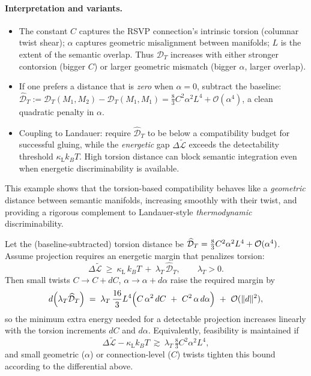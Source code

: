 \documentclass[a4paper,11pt]{article}
\begin{document}
\paragraph{Interpretation and variants.}
\begin{itemize}
\item The constant $C$ captures the RSVP connection’s intrinsic torsion (columnar
twist shear); $\alpha$ captures geometric misalignment between manifolds; $L$
is the extent of the semantic overlap. Thus $\mathcal{D}_T$ increases with
either stronger contorsion (bigger $C$) or larger geometric mismatch (bigger
$\alpha$, larger overlap).
\item If one prefers a distance that is \emph{zero} when $\alpha=0$,
subtract the baseline: $\widehat{\mathcal{D}}_T := \mathcal{D}_T(M_1,M_2)-
\mathcal{D}_T(M_1,M_1)=\tfrac{8}{3}C^2\alpha^2 L^4+\mathcal{O}(\alpha^4)$,
a clean quadratic penalty in $\alpha$.
\item Coupling to Landauer: require $\widehat{\mathcal{D}}_T$ to be below a
compatibility budget for successful gluing, while the \emph{energetic} gap
$\Delta\widetilde{\mathcal{L}}$ exceeds the detectability threshold
$\kappa_{\mathrm{L}}k_B T$. High torsion distance can block semantic
integration even when energetic discriminability is available.
\end{itemize}

This example shows that the torsion-based compatibility behaves like a
\emph{geometric} distance between semantic manifolds, increasing smoothly with
their twist, and providing a rigorous complement to Landauer-style
\emph{thermodynamic} discriminability.

\begin{corollary}
\label{cor:landauer-torsion-coupling}
Let the (baseline-subtracted) torsion distance be
$\widehat{\mathcal{D}}_{T}=\tfrac{8}{3}C^{2}\alpha^{2}L^{4}+{\cal O}(\alpha^{4})$.
Assume projection requires an energetic margin that penalizes torsion:
\[
\Delta\widetilde{\mathcal{L}}\ \ge\ \kappa_{\mathrm{L}}\,k_{B}T\ +\ \lambda_{T}\,\widehat{\mathcal{D}}_{T},
\qquad \lambda_{T}>0.
\]
Then small twists $C\!\to\! C{+}dC$, $\alpha\!\to\!\alpha{+}d\alpha$ raise the
required margin by
\[
d\!\left(\lambda_{T}\widehat{\mathcal{D}}_{T}\right)
\;=\;
\lambda_{T}\,\frac{16}{3}L^{4}\Big(C\,\alpha^{2}\,dC\ +\ C^{2}\,\alpha\,d\alpha\Big)
\ +\ {\cal O}(\|d\|^{2}),
\]
so the minimum extra energy needed for a detectable projection increases linearly
with the torsion increments $dC$ and $d\alpha$. Equivalently, feasibility is
maintained if
\[
\Delta\widetilde{\mathcal{L}}-\kappa_{\mathrm{L}}k_{B}T
\ \gtrsim\
\lambda_{T}\,\tfrac{8}{3}C^{2}\alpha^{2}L^{4},
\]
and small geometric (\(\alpha\)) or connection-level (\(C\)) twists tighten this
bound according to the differential above.
\end{corollary}
\end{document}
